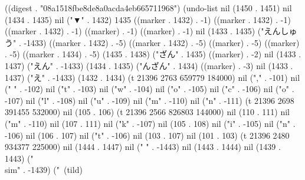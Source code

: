 
((digest . "08a1518fbe8de8a0acda4eb665711968") (undo-list nil (1450 . 1451) nil (1434 . 1435) nil ("▼" . 1432) 1435 ((marker . 1432) . -1) ((marker . 1432) . -1) ((marker . 1432) . -1) ((marker) . -1) ((marker) . -1) nil (1433 . 1435) ("えんしゅう" . -1433) ((marker . 1432) . -5) ((marker . 1432) . -5) ((marker) . -5) ((marker) . -5) ((marker . 1434) . -5) (1435 . 1438) ("ざん" . 1435) ((marker) . -2) nil (1433 . 1437) ("えん" . -1433) (1434 . 1435) ("んざん" . 1434) ((marker) . -3) nil (1433 . 1437) ("え" . -1433) (1432 . 1434) (t 21396 2763 659779 184000) nil ("," . -101) nil (" " . -102) nil ("t" . -103) nil ("w" . -104) nil ("o" . -105) nil ("c" . -106) nil ("o" . -107) nil ("l" . -108) nil ("u" . -109) nil ("m" . -110) nil ("n" . -111) (t 21396 2698 391455 532000) nil (105 . 106) (t 21396 2566 826803 144000) nil (110 . 111) nil ("m" . -110) nil (107 . 111) nil ("k" . -107) nil (105 . 108) nil ("i" . -105) nil ("n" . -106) nil (106 . 107) nil ("t" . -106) nil (103 . 107) nil (101 . 103) (t 21396 2480 934377 225000) nil (1444 . 1447) nil (" " . -1443) nil (1443 . 1444) nil (1439 . 1443) ("\\sim" . -1439) ("~(tild)
